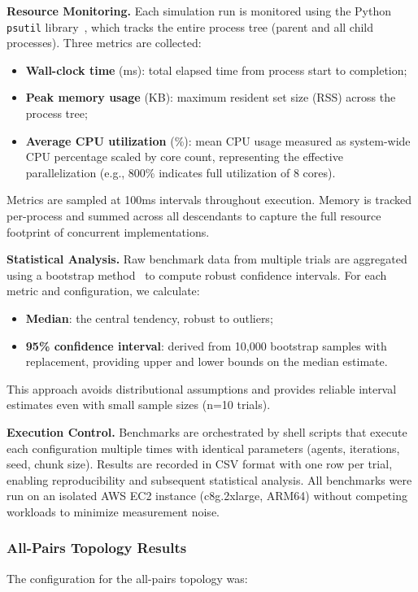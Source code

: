 \documentclass[
]{ceurart}
\begin{document}
\textbf{Resource Monitoring.} Each simulation run is monitored using the Python \texttt{psutil} library~\cite{PythonPsutil}, which tracks the entire process tree (parent and all child processes). Three metrics are collected:
\begin{itemize}
	\item \textbf{Wall-clock time} (ms): total elapsed time from process start to completion;
	\item \textbf{Peak memory usage} (KB): maximum resident set size (RSS) across the process tree;
	\item \textbf{Average CPU utilization} (\%): mean CPU usage measured as system-wide CPU percentage scaled by core count, representing the effective parallelization (e.g., 800\% indicates full utilization of 8 cores).
\end{itemize}

Metrics are sampled at 100ms intervals throughout execution. Memory is tracked per-process and summed across all descendants to capture the full resource footprint of concurrent implementations.

\textbf{Statistical Analysis.} Raw benchmark data from multiple trials are aggregated using a bootstrap method~\cite{Efron1979} to compute robust confidence intervals. For each metric and configuration, we calculate:
\begin{itemize}
	\item \textbf{Median}: the central tendency, robust to outliers;
	\item \textbf{95\% confidence interval}: derived from 10,000 bootstrap samples with replacement, providing upper and lower bounds on the median estimate.
\end{itemize}

This approach avoids distributional assumptions and provides reliable interval estimates even with small sample sizes (n=10 trials).

\textbf{Execution Control.} Benchmarks are orchestrated by shell scripts that execute each configuration multiple times with identical parameters (agents, iterations, seed, chunk size). Results are recorded in CSV format with one row per trial, enabling reproducibility and subsequent statistical analysis. All benchmarks were run on an isolated AWS EC2 instance (c8g.2xlarge, ARM64) without competing workloads to minimize measurement noise.

\subsubsection{All-Pairs Topology Results}
The configuration for the all-pairs topology was:
\end{document}
